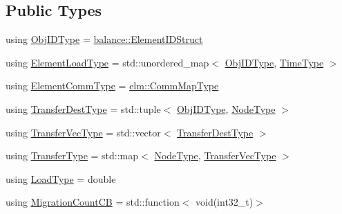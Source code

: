 \subsection*{Public Types}
\begin{DoxyCompactItemize}
\item 
using \hyperlink{structvt_1_1vrt_1_1collection_1_1lb_1_1_base_l_b_a790b22acf448880599724749cdc4e9b3}{Obj\+I\+D\+Type} = \hyperlink{namespacevt_1_1vrt_1_1collection_1_1balance_a9f5b53fafb270212279a4757d2c4cd28}{balance\+::\+Element\+I\+D\+Struct}
\item 
using \hyperlink{structvt_1_1vrt_1_1collection_1_1lb_1_1_base_l_b_aa286d31a0820a8fc9218ccb858368fca}{Element\+Load\+Type} = std\+::unordered\+\_\+map$<$ \hyperlink{structvt_1_1vrt_1_1collection_1_1lb_1_1_base_l_b_a790b22acf448880599724749cdc4e9b3}{Obj\+I\+D\+Type}, \hyperlink{namespacevt_a876a9d0cd5a952859c72de8a46881442}{Time\+Type} $>$
\item 
using \hyperlink{structvt_1_1vrt_1_1collection_1_1lb_1_1_base_l_b_a83eb4daec14edfb8780422e95b8e38d3}{Element\+Comm\+Type} = \hyperlink{namespacevt_1_1elm_a38487cb8896b9b4763efa9022fab560e}{elm\+::\+Comm\+Map\+Type}
\item 
using \hyperlink{structvt_1_1vrt_1_1collection_1_1lb_1_1_base_l_b_add886785f64ea725005f1263fd1393be}{Transfer\+Dest\+Type} = std\+::tuple$<$ \hyperlink{structvt_1_1vrt_1_1collection_1_1lb_1_1_base_l_b_a790b22acf448880599724749cdc4e9b3}{Obj\+I\+D\+Type}, \hyperlink{namespacevt_a866da9d0efc19c0a1ce79e9e492f47e2}{Node\+Type} $>$
\item 
using \hyperlink{structvt_1_1vrt_1_1collection_1_1lb_1_1_base_l_b_a329e8179ec41a1bd4924c79fe23a79af}{Transfer\+Vec\+Type} = std\+::vector$<$ \hyperlink{structvt_1_1vrt_1_1collection_1_1lb_1_1_base_l_b_add886785f64ea725005f1263fd1393be}{Transfer\+Dest\+Type} $>$
\item 
using \hyperlink{structvt_1_1vrt_1_1collection_1_1lb_1_1_base_l_b_a0a5f834082d85c558bdaf84c464c1ead}{Transfer\+Type} = std\+::map$<$ \hyperlink{namespacevt_a866da9d0efc19c0a1ce79e9e492f47e2}{Node\+Type}, \hyperlink{structvt_1_1vrt_1_1collection_1_1lb_1_1_base_l_b_a329e8179ec41a1bd4924c79fe23a79af}{Transfer\+Vec\+Type} $>$
\item 
using \hyperlink{structvt_1_1vrt_1_1collection_1_1lb_1_1_base_l_b_a215e22b9f12678303f49615ae3be05cc}{Load\+Type} = double
\item 
using \hyperlink{structvt_1_1vrt_1_1collection_1_1lb_1_1_base_l_b_aba7198eb30aef1b19c1f1efdea760543}{Migration\+Count\+CB} = std\+::function$<$ void(int32\+\_\+t)$>$

\end{DoxyCompactItemize}
